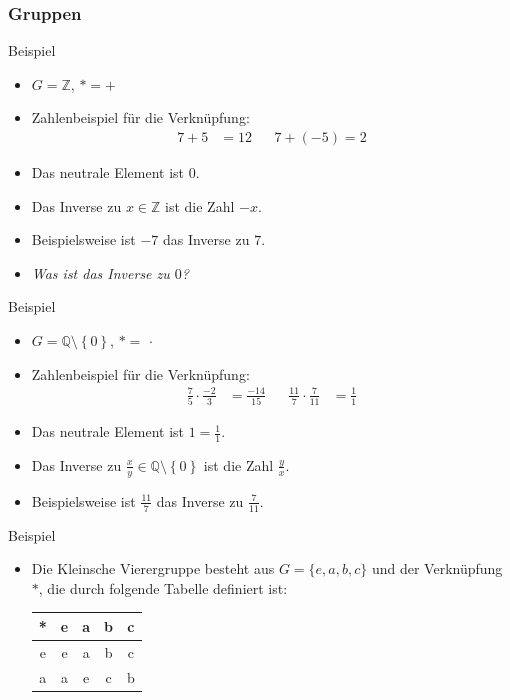 \documentclass{beamer}
\newcommand\ZZ{\mathbb Z}
\newcommand\QQ{\mathbb Q}
\newcommand\cbc[1]{\left\{{#1}\right\}}
\newcommand{\ue}{\"u}
\begin{document}
\begin{frame}\frametitle{Gruppen}
	\begin{overprint}
		\begin{block}{Beispiel}
			\begin{itemize}
				\item $G=\ZZ$, $*=+$
				\item Zahlenbeispiel f\ue r die Verkn\ue pfung:
					\begin{align*}
						7+5&=12&&7+(-5)=2
					\end{align*}
				\item Das neutrale Element ist $0$.
				\item Das Inverse zu $x\in\ZZ$ ist die Zahl $-x$.
				\item Beispielsweise ist $-7$ das Inverse zu $7$.
				\item {\itshape Was ist das Inverse zu $0$?}
			\end{itemize}
		\end{block}	
		\begin{block}{Beispiel}
			\begin{itemize}
				\item $G=\QQ\setminus\cbc0$, $*=\,\cdot\,$
				\item Zahlenbeispiel f\ue r die Verkn\ue pfung:
					\begin{align*}
						\frac{7}{5}\cdot\frac{-2}{3}&=\frac{-14}{15}&&\frac{11}{7}\cdot\frac{7}{11}&=\frac{1}{1}
					\end{align*}
				\item Das neutrale Element ist $1=\frac{1}{1}$.
				\item Das Inverse zu $\frac{x}{y}\in\QQ\setminus\cbc0$ ist die Zahl $\frac{y}{x}$.
				\item Beispielsweise ist $\frac{11}{7}$ das Inverse zu $\frac{7}{11}$.
			\end{itemize}
		\end{block}	
		\begin{block}{Beispiel}
			\begin{itemize}
				\item Die \alert{Kleinsche Vierergruppe} besteht aus $G=\{e,a,b,c\}$ und der Verkn\ue pfung $*$, die durch folgende Tabelle definiert ist:
					\begin{center}
						\begin{tabular}{c|cccc}
							*&e&a&b&c\\\hline
							e&e&a&b&c\\
							a&a&e&c&b\\

\end{tabular}
\end{center}
\end{itemize}
\end{block}
\end{overprint}
\end{frame}
\end{document}
